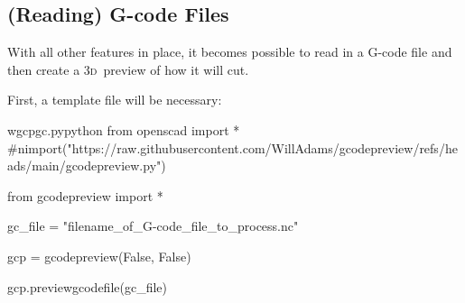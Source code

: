 \documentclass{ltxdoc}
\begin{document}
 
\subsection{(Reading) G-code Files}

With all other features in place, it becomes possible to read in a G-code file and then create a \textsc{3d}~preview of how it will cut. 

First, a template file will be necessary:

\lstset{firstnumber=1}%
\begin{writecode}{w}{gcpgc.py}{python}
from openscad import *
#nimport("https://raw.githubusercontent.com/WillAdams/gcodepreview/refs/heads/main/gcodepreview.py")

from gcodepreview import *

gc_file = "filename_of_G-code_file_to_process.nc"

gcp = gcodepreview(False, False)

gcp.previewgcodefile(gc_file)

\end{writecode}
\end{document}
